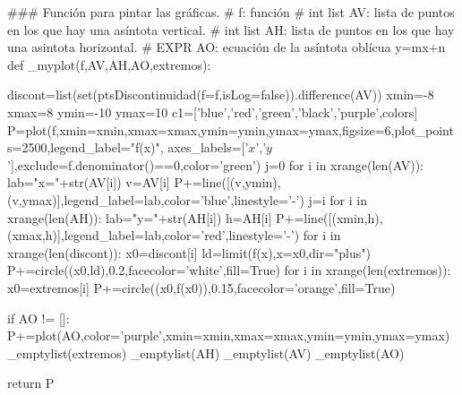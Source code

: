 \begin{sagesilent}
### Función para pintar las gráficas.
# f: función
# int list AV: lista de puntos en los que hay una asíntota vertical.
# int list AH: lista de puntos en los que hay una asintota horizontal.
# EXPR AO: ecuación de la asíntota oblícua y=mx+n
def _myplot(f,AV,AH,AO,extremos):
 
 discont=list(set(ptsDiscontinuidad(f=f,isLog=false)).difference(AV))
 xmin=-8
 xmax=8
 ymin=-10
 ymax=10
 c1=['blue','red','green','black','purple',colors]
 P=plot(f,xmin=xmin,xmax=xmax,ymin=ymin,ymax=ymax,figsize=6,plot_points=2500,legend_label="f(x)", axes_labels=['$x$','$y$'],exclude=f.denominator()==0,color='green')
 j=0
 for i in xrange(len(AV)):
  lab="x="+str(AV[i])
  v=AV[i]
  P+=line([(v,ymin),(v,ymax)],legend_label=lab,color='blue',linestyle='-')
  j=i
 for i in xrange(len(AH)):
  lab="y="+str(AH[i])
  h=AH[i]
  P+=line([(xmin,h),(xmax,h)],legend_label=lab,color='red',linestyle='-')
 for i in xrange(len(discont)):
  x0=discont[i]
  ld=limit(f(x),x=x0,dir="plus")
  P+=circle((x0,ld),0.2,facecolor='white',fill=True)
 for i in xrange(len(extremos)):
  x0=extremos[i]
  P+=circle((x0,f(x0)),0.15,facecolor='orange',fill=True)
  
 if AO != []:
  P+=plot(AO,color='purple',xmin=xmin,xmax=xmax,ymin=ymin,ymax=ymax)
 _emptylist(extremos)
 _emptylist(AH)
 _emptylist(AV)
 _emptylist(AO)
 
 return P
\end{sagesilent}


